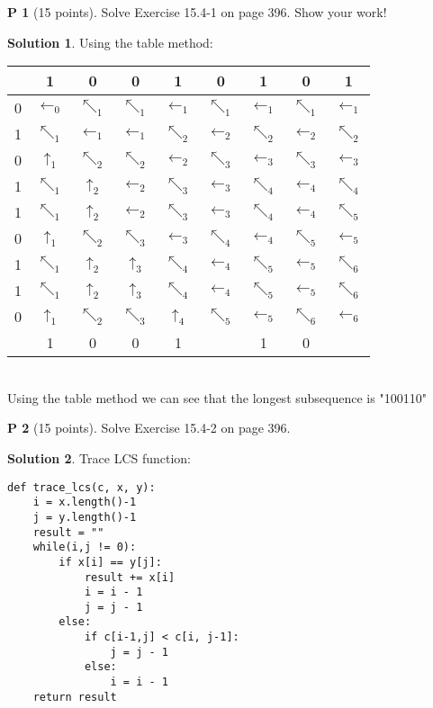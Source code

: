 \documentclass{article}
\theoremstyle{definition}
\newtheorem{problem}{P}
\newtheorem*{solution}{Solution}
\begin{document}
\begin{problem}[15 points]
Solve Exercise 15.4-1 on page 396. Show your work!
\end{problem}
\begin{solution}Using the table method:\\
\begin{tabular}{| c | c c c c c c c c |}
\hline
 & 1 & 0 & 0 & 1 & 0 & 1 & 0 & 1\\
\hline
0 & \cellcolor{yellow}$\leftarrow_0$ & $\nwarrow_1$ & $\nwarrow_1$ & $\leftarrow_1$ & $\nwarrow_1$ & $\leftarrow_1$ & $\nwarrow_1$ & $\leftarrow_1$ \\
1 & \cellcolor{yellow}$\nwarrow_1$ & $\leftarrow_1$ & $\leftarrow_1$ & $\nwarrow_2$ & $\leftarrow_2$ & $\nwarrow_2$ & $\leftarrow_2$ & $\nwarrow_2$\\
0 & $\uparrow_1$ & \cellcolor{yellow}$\nwarrow_2$ & $\nwarrow_2$ & $\leftarrow_2$ & $\nwarrow_3$ & $\leftarrow_3$ & $\nwarrow_3$ & $\leftarrow_3$\\
1 & $\nwarrow_1$ & \cellcolor{yellow}$\uparrow_2$ & $\leftarrow_2$ & $\nwarrow_3$ & $\leftarrow_3$ & $\nwarrow_4$ & $\leftarrow_4$ & $\nwarrow_4$\\
1 & $\nwarrow_1$ & \cellcolor{yellow}$\uparrow_2$ & $\leftarrow_2$ & $\nwarrow_3$ & $\leftarrow_3$ & $\nwarrow_4$ & $\leftarrow_4$ & $\nwarrow_5$\\
0 & $\uparrow_1$ & $\nwarrow_2$ & \cellcolor{yellow}$\nwarrow_3$ & $\leftarrow_3$ & $\nwarrow_4$ & $\leftarrow_4$ & $\nwarrow_5$ & $\leftarrow_5$\\
1 & $\nwarrow_1$ & $\uparrow_2$ & $\uparrow_3$ & \cellcolor{yellow}$\nwarrow_4$ & \cellcolor{yellow}$\leftarrow_4$ & $\nwarrow_5$ & $\leftarrow_5$ & $\nwarrow_6$\\
1 & $\nwarrow_1$ & $\uparrow_2$ & $\uparrow_3$ & $\nwarrow_4$ & $\leftarrow_4$ & \cellcolor{yellow}$\nwarrow_5$ & $\leftarrow_5$ & $\nwarrow_6$\\
0 & $\uparrow_1$ & $\nwarrow_2$ & $\nwarrow_3$ & $\uparrow_4$ & $\nwarrow_5$ & $\leftarrow_5$ & \cellcolor{yellow}$\nwarrow_6$ & \cellcolor{yellow}$\leftarrow_6$\\
\hline
 & 1 & 0 & 0 & 1 &  & 1 & 0 &\\
\hline
\end{tabular}\\
Using the table method we can see that the longest subsequence is "100110"
\end{solution}

\begin{problem}[15 points]
Solve Exercise 15.4-2 on page 396. 
\end{problem}
\begin{solution}Trace LCS function:\\
\begin{verbatim}
def trace_lcs(c, x, y):
    i = x.length()-1
    j = y.length()-1
    result = ""
    while(i,j != 0):
        if x[i] == y[j]:
            result += x[i]
            i = i - 1
            j = j - 1
        else:
            if c[i-1,j] < c[i, j-1]:
                j = j - 1
            else:
                i = i - 1
    return result
\end{verbatim}
\end{solution}
\end{document}
